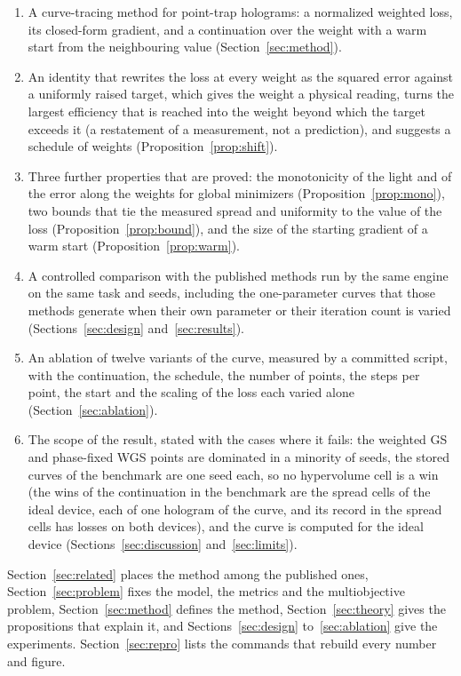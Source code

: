 \begin{enumerate}
\item A curve-tracing method for point-trap holograms: a normalized weighted loss, its closed-form gradient, and a continuation over the weight with a warm start from the neighbouring value (Section~\ref{sec:method}).
\item An identity that rewrites the loss at every weight as the squared error against a uniformly raised target, which gives the weight a physical reading, turns the largest efficiency that is reached into the weight beyond which the target exceeds it (a restatement of a measurement, not a prediction), and suggests a schedule of weights (Proposition~\ref{prop:shift}).
\item Three further properties that are proved: the monotonicity of the light and of the error along the weights for global minimizers (Proposition~\ref{prop:mono}), two bounds that tie the measured spread and uniformity to the value of the loss (Proposition~\ref{prop:bound}), and the size of the starting gradient of a warm start (Proposition~\ref{prop:warm}).
\item A controlled comparison with the published methods run by the same engine on the same task and seeds, including the one-parameter curves that those methods generate when their own parameter or their iteration count is varied (Sections~\ref{sec:design} and~\ref{sec:results}).
\item An ablation of twelve variants of the curve, measured by a committed script, with the continuation, the schedule, the number of points, the steps per point, the start and the scaling of the loss each varied alone (Section~\ref{sec:ablation}).
\item The scope of the result, stated with the cases where it fails: the weighted GS and phase-fixed WGS points are dominated in a minority of seeds, the stored curves of the benchmark are one seed each, so no hypervolume cell is a win (the wins of the continuation in the benchmark are the \spreadWins{} spread cells of the ideal device, each of one hologram of the curve, and its record in the spread cells has losses on both devices), and the curve is computed for the ideal device (Sections~\ref{sec:discussion} and~\ref{sec:limits}).
\end{enumerate}
Section~\ref{sec:related} places the method among the published ones, Section~\ref{sec:problem} fixes the model, the metrics and the multiobjective problem, Section~\ref{sec:method} defines the method, Section~\ref{sec:theory} gives the propositions that explain it, and
Sections~\ref{sec:design} to~\ref{sec:ablation} give the experiments. Section~\ref{sec:repro} lists the commands that rebuild every number and figure.
